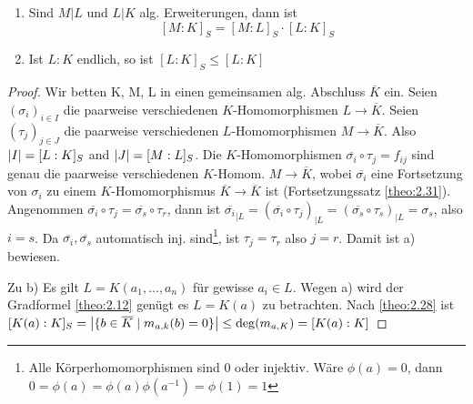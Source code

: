 \documentclass[../main.tex]{subfiles}
\begin{document}
\begin{lemma}\label{theo:2.46}$ $
    \begin{enumerate}[label=\alph*)]
        \item Sind $M|L$ und $L|K$ alg. Erweiterungen, dann ist $$[M:K]_S = [M:L]_S \cdot [L:K]_S$$
        \item Ist $L:K$ endlich, so ist $[L:K]_S \leq [L:K]$
    \end{enumerate}
\end{lemma}
\begin{proof}
    Wir betten K, M, L in einen gemeinsamen alg. Abschluss $\overline{K}$ ein.
    Seien $(\sigma_i)_{i\in I}$ die paarweise verschiedenen $K$-Homomorphismen $L\rightarrow \overline{K}$.
    Seien $(\tau_j)_{j\in J}$ die paarweise verschiedenen $L$-Homomorphismen $M\rightarrow \overline{K}$.
    Also $\left\vert I \right\vert = [L:K]_S$ and $\left\vert J \right\vert=[M:L]_S$.
    Die $K$-Homomorphismen $\overline{\sigma_i} \circ \tau_j = f_{ij}$ sind genau die paarweise verschiedenen $K$-Homom. 
    $M\rightarrow \overline{K}$, wobei $\overline{\sigma_i}$ eine Fortsetzung von $\sigma_i$ zu einem $K$-Homomorphismus $\overline{K} \rightarrow \overline{K}$ ist (Fortsetzungssatz \cref{theo:2.31}). 
    Angenommen $\overline{\sigma_i} \circ \tau_j = \overline{\sigma_s} \circ \tau_r$, dann ist $\overline{\sigma_i}_{|L} = (\overline{\sigma_i} \circ \tau_j)_{|L} =(\overline{\sigma_s} \circ \tau_s)_{|L} = \sigma_s$, also $i=s$.
    Da $\overline{\sigma_i},\overline{\sigma_s}$ automatisch inj. sind\footnote{Alle Körperhomomorphismen sind $0$ oder injektiv. Wäre $\phi(a)=0$, dann $0 = \phi(a) = \phi(a)\phi(a^{-1}) = \phi(1)=1$}, ist $\tau_j = \tau_r$ also $j = r$.
    Damit ist a) bewiesen.

    Zu b)
    Es gilt $L=K(a_1, \dots, a_n)$ für gewisse $a_i\in L$. Wegen a) wird der Gradformel \cref{theo:2.12} genügt es $L=K(a)$ zu betrachten.
    Nach \cref{theo:2.28} ist $[K(a):K]_S=\left\vert \{b\in \overline{K}\mid m_{a,k}(b)=0\} \right\vert \leq \deg(m_{a,K}) = [K(a):K]$
\end{proof}
\end{document}
